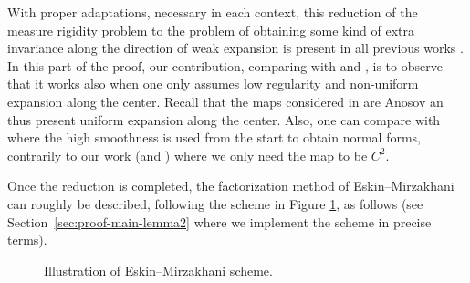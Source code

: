 \documentclass[a4paper,11pt,reqno]{amsart}
\theoremstyle{definition}
\begin{document}
With proper adaptations, necessary in each context, this reduction of the measure rigidity problem to the problem of obtaining some kind of extra invariance along the direction of weak expansion is present in all previous works \cite{ALOS,EskinMirzakhani,BRH,BenoistQuintI}. In this part of the proof, our contribution, comparing with \cite{ALOS} and \cite{Katz}, is to observe that it works also when one only assumes low regularity and non-uniform expansion along the center. Recall that the maps considered in \cite{ALOS} are Anosov an thus present uniform expansion along the center. Also, one can compare with \cite{Katz} where the high smoothness is used from the start to obtain normal forms, contrarily to our work (and \cite{ALOS}) where we only need the map to be $C^2$.  

Once the reduction is completed, the factorization method of Eskin--Mirzakhani can roughly be described, following the scheme in Figure \ref{fig:EMscheme}, as follows (see Section~\ref{sec:proof-main-lemma2} where we implement the scheme in precise terms).

\begin{figure}[ht]

\caption{\label{fig:EMscheme} Illustration of Eskin--Mirzakhani scheme.}
\end{figure}
\end{document}
